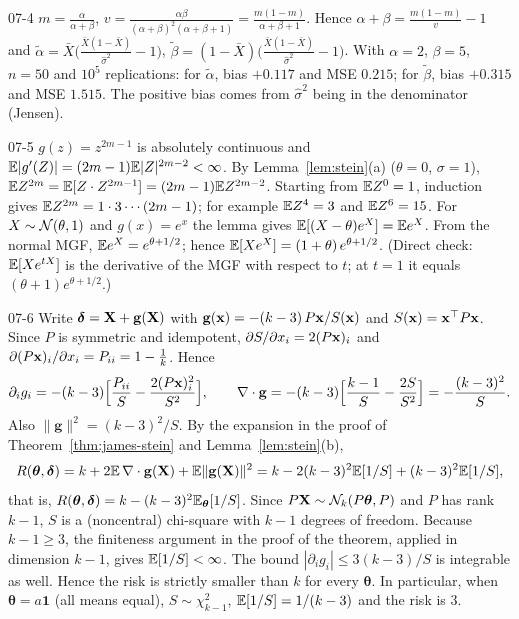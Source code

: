\begin{solution}{07-4}
$m=\frac{\alpha}{\alpha+\beta}$, $v=\frac{\alpha\beta}{(\alpha+\beta)^2(\alpha+\beta+1)}=\frac{m(1-m)}{\alpha+\beta+1}$. Hence $\alpha+\beta=\frac{m(1-m)}{v}-1$ and
$\tilde\alpha=\bar X\Big(\frac{\bar X(1-\bar X)}{\hat\sigma^2}-1\Big)$, $\tilde\beta=(1-\bar X)\Big(\frac{\bar X(1-\bar X)}{\hat\sigma^2}-1\Big)$.
With $\alpha=2$, $\beta=5$, $n=50$ and $10^5$ replications: for $\tilde\alpha$, bias $+0.117$ and MSE $0.215$; for $\tilde\beta$, bias $+0.315$ and MSE $1.515$. The positive bias comes from $\hat\sigma^2$ being in the denominator (Jensen).
\end{solution}

\begin{solution}{07-5}
$g(z)=z^{2m-1}$ is absolutely continuous and $\mathbb{E}|g'(Z)|=(2m-1)\mathbb{E}|Z|^{2m-2}<\infty$. By Lemma~\ref{lem:stein}(a) ($\theta=0$, $\sigma=1$), $\mathbb{E} Z^{2m}=\mathbb{E}[Z\cdot Z^{2m-1}]=(2m-1)\mathbb{E} Z^{2m-2}$. Starting from $\mathbb{E} Z^0=1$, induction gives $\mathbb{E} Z^{2m}=1\cdot3\cdots(2m-1)$; for example $\mathbb{E} Z^4=3$ and $\mathbb{E} Z^6=15$.
For $X\sim\mathcal{N}(\theta,1)$ and $g(x)=e^x$ the lemma gives $\mathbb{E}[(X-\theta)e^X]=\mathbb{E} e^X$. From the normal MGF, $\mathbb{E} e^X=e^{\theta+1/2}$; hence $\mathbb{E}[Xe^X]=(1+\theta)\,e^{\theta+1/2}$. (Direct check: $\mathbb{E}[Xe^{tX}]$ is the derivative of the MGF with respect to $t$; at $t=1$ it equals $(\theta+1)e^{\theta+1/2}$.)
\end{solution}

\begin{solution}{07-6}
Write $\bm\delta=\mathbf{X}+\mathbf g(\mathbf{X})$ with $\mathbf g(\mathbf{x})=-(k-3)\,P\mathbf{x}/S(\mathbf{x})$ and $S(\mathbf{x})=\mathbf{x}^\top P\mathbf{x}$. Since $P$ is symmetric and idempotent, $\partial S/\partial x_i=2(P\mathbf{x})_i$ and $\partial(P\mathbf{x})_i/\partial x_i=P_{ii}=1-\frac1k$. Hence
\[
\partial_ig_i=-(k-3)\Big[\frac{P_{ii}}{S}-\frac{2(P\mathbf{x})_i^2}{S^2}\Big],\qquad
\nabla\cdot\mathbf g=-(k-3)\Big[\frac{k-1}{S}-\frac{2S}{S^2}\Big]=-\frac{(k-3)^2}{S}.
\]
Also $\|\mathbf g\|^2=(k-3)^2/S$. By the expansion in the proof of Theorem~\ref{thm:james-stein} and Lemma~\ref{lem:stein}(b),
\[
R(\bm\theta,\bm\delta)=k+2\mathbb{E}\,\nabla\cdot\mathbf g(\mathbf{X})+\mathbb{E}\|\mathbf g(\mathbf{X})\|^2=k-2(k-3)^2\mathbb{E}[1/S]+(k-3)^2\mathbb{E}[1/S],
\]
that is, $R(\bm\theta,\bm\delta)=k-(k-3)^2\mathbb{E}_{\bm\theta}[1/S]$.
Since $P\mathbf{X}\sim\mathcal{N}_k(P\bm\theta,P)$ and $P$ has rank $k-1$, $S$ is a (noncentral) chi-square with $k-1$ degrees of freedom. Because $k-1\ge3$, the finiteness argument in the proof of the theorem, applied in dimension $k-1$, gives $\mathbb{E}[1/S]<\infty$. The bound $|\partial_ig_i|\le3(k-3)/S$ is integrable as well. Hence the risk is strictly smaller than $k$ for every $\bm\theta$. In particular, when $\bm\theta=a\mathbf 1$ (all means equal), $S\sim\chi^2_{k-1}$, $\mathbb{E}[1/S]=1/(k-3)$ and the risk is $3$.
\end{solution}

